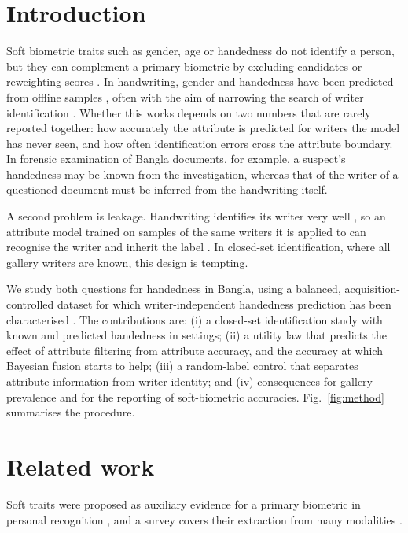 \documentclass[conference,a4paper]{IEEEtran}
\begin{document}
\section{Introduction}
Soft biometric traits such as gender, age or handedness do not identify a person, but they can complement a primary biometric by excluding candidates or reweighting scores \cite{jain2004soft,dantcheva2016soft}. In handwriting, gender and handedness have been predicted from offline samples \cite{liwicki2011gender,siddiqi2015gender,hassaine2013icdar,bouadjenek2016soft,almaadeed2016handedness,morera2018handedness,rahmanian2021handedness}, often with the aim of narrowing the search of writer identification \cite{banglahand2026dataset}. Whether this works depends on two numbers that are rarely reported together: how accurately the attribute is predicted for writers the model has never seen, and how often identification errors cross the attribute boundary. In forensic examination of Bangla documents, for example, a suspect's handedness may be known from the investigation, whereas that of the writer of a questioned document must be inferred from the handwriting itself.

A second problem is leakage. Handwriting identifies its writer very well \cite{bulacu2007text,schomaker2007codebooks}, so an attribute model trained on samples of the same writers it is applied to can recognise the writer and inherit the label \cite{kaufman2012leakage}. In closed-set identification, where all gallery writers are known, this design is tempting.

We study both questions for handedness in Bangla, using a balanced, acquisition-controlled dataset \cite{banglahand2026dataset} for which writer-independent handedness prediction has been characterised \cite{anon2026handedness}. The contributions are: (i) a closed-set identification study with known and predicted handedness in \vnSettings{} settings; (ii) a utility law that predicts the effect of attribute filtering from attribute accuracy, and the accuracy at which Bayesian fusion starts to help; (iii) a random-label control that separates attribute information from writer identity; and (iv) consequences for gallery prevalence and for the reporting of soft-biometric accuracies. Fig.~\ref{fig:method} summarises the procedure.

\section{Related work}
\label{sec:related}
Soft traits were proposed as auxiliary evidence for a primary biometric in personal recognition \cite{jain2004soft}, and a survey covers their extraction from many modalities \cite{dantcheva2016soft}.
\end{document}
